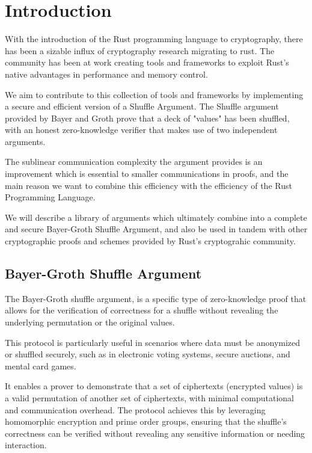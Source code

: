 \documentclass[12pt,a4paper]{report}
\begin{document}
\tableofcontents


\newpage
{}

\chapter{Introduction}
With the introduction of the Rust programming language to cryptography, there has been a sizable influx of cryptography research migrating to rust. 
The community has been at work creating tools and frameworks to exploit Rust's native advantages in performance and memory control. \par
We aim to contribute to this collection of tools and frameworks by implementing a secure and efficient version of a Shuffle Argument.
The Shuffle argument provided by Bayer and Groth \cite{bgshuffle} prove that a deck of "values" has been shuffled, with an honest zero-knowledge verifier that makes use of two independent arguments.\par
The sublinear communication complexity the argument provides is an improvement which is essential to smaller communications in proofs, and the main reason we want to combine this efficiency with the efficiency of the Rust Programming Language.\par
We will describe a library of arguments which ultimately combine into a complete and secure Bayer-Groth Shuffle Argument, 
and also be used in tandem with other cryptographic proofs and schemes provided by Rust's cryptograhic community.
\section{Bayer-Groth Shuffle Argument}
The Bayer-Groth shuffle argument\cite{bgshuffle}, is a specific type of zero-knowledge proof that
allows for the verification of correctness for a shuffle without revealing 
the underlying permutation or the original values. \par
This protocol is particularly useful in scenarios where data must be anonymized or shuffled 
securely, such as in electronic voting systems, secure auctions, and mental card games. \par
It enables a prover to demonstrate that a set of ciphertexts (encrypted values) is a valid 
permutation of another set of ciphertexts, with minimal computational and communication overhead.
The protocol achieves this by leveraging homomorphic encryption and prime order groups, ensuring that the shuffle's correctness can be verified without revealing any sensitive information or needing interaction.
\end{document}
